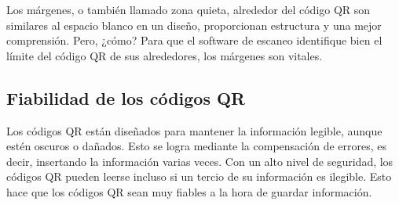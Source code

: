 Los márgenes, o también llamado zona quieta, alrededor del código QR son similares al espacio blanco en un diseño, proporcionan estructura y una mejor comprensión. Pero, ¿cómo? Para que el software de escaneo identifique bien el límite del código QR de sus alrededores, los márgenes son vitales.

\subsection{Fiabilidad de los códigos QR}
Los códigos QR están diseñados para mantener la información legible, aunque estén oscuros o dañados. Esto se logra mediante la compensación de errores, es decir, insertando la información varias veces. Con un alto nivel de seguridad, los códigos QR pueden leerse incluso si un tercio de su información es ilegible. Esto hace que los códigos QR sean muy fiables a la hora de guardar información. \\

